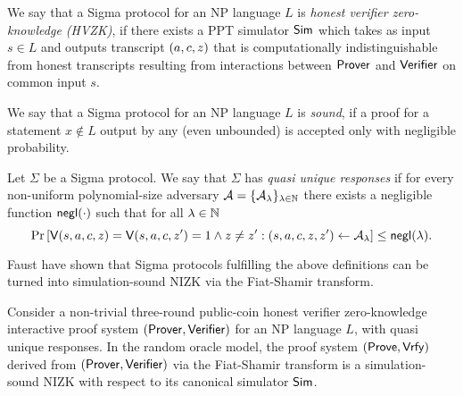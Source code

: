 \begin{definition}
We say that a Sigma protocol for an NP language  $L$ is \emph{honest verifier zero-knowledge (HVZK)}, if there exists a PPT simulator $\mathsf{Sim}$ which takes as input $s \in L$ and outputs transcript $(a,c,z)$ that is computationally indistinguishable from honest
transcripts resulting from interactions between $\mathsf{Prover}$ and $\mathsf{Verifier}$ on common input $s$.
\end{definition}

\begin{definition}[Soundness]
We say that a Sigma protocol for an NP language $L$ is \emph{sound}, if a proof for a statement $x \notin L$ output by any (even unbounded) is accepted only with negligible probability.
\end{definition}

\begin{definition}
Let $\Sigma$ be a Sigma protocol. We say that $\Sigma$ has \emph{quasi unique responses} if for every non-uniform polynomial-size adversary $\mathcal{A} = \{\mathcal{A}_{\lambda}\}_{\lambda \in \mathbb{N}}$ there exists a negligible function $\mathsf{negl}(\cdot)$ such that for all $\lambda \in \mathbb{N}$ 
\[\Pr\left[ \mathsf{V}(s,a,c,z) = \mathsf{V}(s,a,c,z' ) = 1 \land z \neq z' : (s, a, c , z, z')\leftarrow \mathcal{A}_{\lambda} \right] \leq \mathsf{negl}(\lambda).\]
\end{definition}

Faust \etal \cite{INDOCRYPT:FKMV12} have shown that Sigma protocols fulfilling the above definitions can be turned into simulation-sound NIZK via the Fiat-Shamir transform. 

\begin{theorem}\label{thm:fs}
Consider a non-trivial three-round public-coin honest verifier zero-knowledge interactive proof system $(\mathsf{Prover}, \mathsf{Verifier})$ for an NP language $L$, with quasi unique responses. In the random oracle model, the proof system $(\mathsf{Prove}, \mathsf{Vrfy})$ derived from $(\mathsf{Prover}, \mathsf{Verifier})$ via the Fiat-Shamir transform is a simulation-sound NIZK with respect to its canonical simulator $\mathsf{Sim}$.
\end{theorem}

